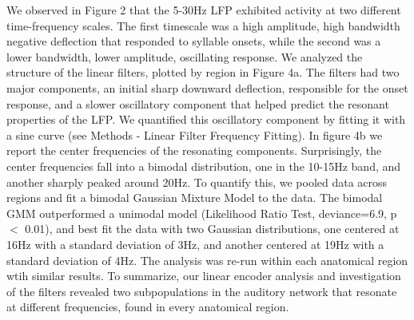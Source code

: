 We observed in Figure 2 that the 5-30Hz LFP exhibited activity at two different time-frequency scales. The first timescale was a high amplitude, high bandwidth negative deflection that responded to syllable onsets, while the second was a lower bandwidth, lower amplitude, oscillating response. We analyzed the structure of the linear filters, plotted by region in Figure 4a. The filters had two major components, an initial sharp downward deflection, responsible for the onset response, and a slower oscillatory component that helped predict the resonant properties of the LFP. We quantified this oscillatory component by fitting it with a sine curve (see Methods - Linear Filter Frequency Fitting). In figure 4b we report the center frequencies of the resonating components. Surprisingly, the center frequencies fall into a bimodal distribution, one in the 10-15Hz band, and another sharply peaked around 20Hz. To quantify this, we pooled data across regions and fit a bimodal Gaussian Mixture Model to the data. The bimodal GMM outperformed a unimodal model (Likelihood Ratio Test, deviance=6.9, p $<$ 0.01), and best fit the data with two Gaussian distributions, one centered at 16Hz with a standard deviation of 3Hz, and another centered at 19Hz with a standard deviation of 4Hz. The analysis was re-run within each anatomical region wtih similar results. To summarize, our linear encoder analysis and investigation of the filters revealed two subpopulations in the auditory network that resonate at different frequencies, found in every anatomical region.


